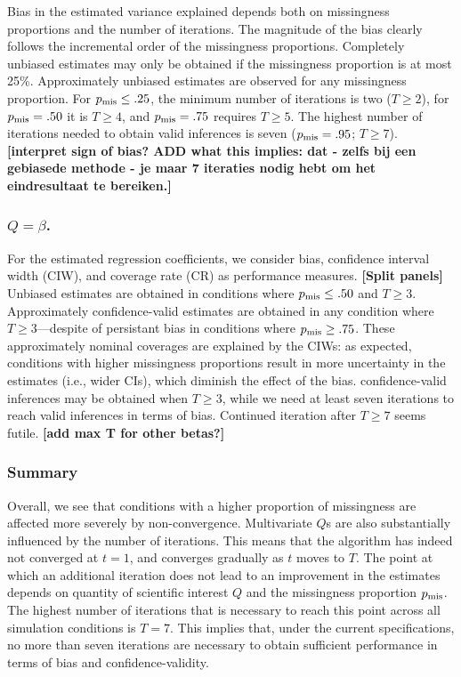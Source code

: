 \documentclass[Royal,times,sageh]{sagej}
\begin{document}
Bias in the estimated variance explained depends both on missingness proportions and the number of iterations. The magnitude of the bias clearly follows the incremental order of the missingness proportions. Completely unbiased estimates may only be obtained if the missingness proportion is at most 25\%. Approximately unbiased estimates are observed for any missingness proportion. For \(p_{\rm mis}\leq.25\), the minimum number of iterations is two (\(T\geq2\)), for \(p_{\rm mis}=.50\) it is \(T\geq4\), and \(p_{\rm mis}=.75\) requires \(T\geq5\). The highest number of iterations needed to obtain valid inferences is seven (\(p_{\rm mis}=.95\); \(T\geq7\)). \textbf{{[}interpret sign of bias? ADD what this implies: dat - zelfs bij een gebiasede methode - je maar 7 iteraties nodig hebt om het eindresultaat te bereiken.{]}}

\hypertarget{qbeta.}{%
\subsubsection{\texorpdfstring{\(Q=\beta\).}{Q=\textbackslash beta.}}\label{qbeta.}}

For the estimated regression coefficients, we consider bias, confidence interval width (CIW), and coverage rate (CR) as performance measures. \textbf{{[}Split panels{]}} Unbiased estimates are obtained in conditions where \(p_{\rm mis}\leq.50\) and \(T\geq3\). Approximately confidence-valid estimates are obtained in any condition where \(T\geq3\)---despite of persistant bias in conditions where \(p_{\rm mis}\geq.75\). These approximately nominal coverages are explained by the CIWs: as expected, conditions with higher missingness proportions result in more uncertainty in the estimates (i.e., wider CIs), which diminish the effect of the bias. confidence-valid inferences may be obtained when \(T\geq3\), while we need at least seven iterations to reach valid inferences in terms of bias. Continued iteration after \(T\geq7\) seems futile. \textbf{{[}add max T for other betas?{]}}

\hypertarget{summary}{%
\subsubsection{Summary}\label{summary}}

Overall, we see that conditions with a higher proportion of missingness are affected more severely by non-convergence. Multivariate \(Q\)s are also substantially influenced by the number of iterations. This means that the algorithm has indeed not converged at \(t=1\), and converges gradually as \(t\) moves to \(T\). The point at which an additional iteration does not lead to an improvement in the estimates depends on quantity of scientific interest \(Q\) and the missingness proportion \(p_{\rm mis}\). The highest number of iterations that is necessary to reach this point across all simulation conditions is \(T=7\). This implies that, under the current specifications, no more than seven iterations are necessary to obtain sufficient performance in terms of bias and confidence-validity.
\end{document}

